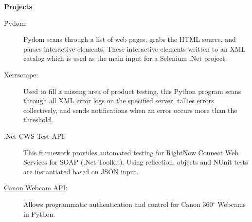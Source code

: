 \documentclass[letterpaper,11pt]{article}
\newcommand{\resheading}[1]{{\large \colorbox{mygrey}{\begin{minipage}{\textwidth}{\textbf{#1 \vphantom{p\^{E}}}}\end{minipage}}}}
\begin{document}
\begin{description}
	\end{description} %

\resheading{\href{http://www.derekhildreth.com/portfolio.php}{Projects}}

\begin{description}
\item[Pydom:] { \footnotesize Pydom scans through a list of web pages, grabs the HTML source, and parses interactive elements. These interactive elements written to an XML catalog which is used as the main input for a Selenium .Net project.}

\item[Xerrscrape:] { \footnotesize Used to fill a missing area of product testing, this Python program scans through all XML error logs on the specified server, tallies errors collectively, and sends notifications when an error occurs more than the threshold.}

\item[.Net CWS Test API:] { \footnotesize This framework provides automated testing for RightNow Connect Web Services for SOAP (.Net Toolkit).  Using reflection, objects and NUnit tests are instantiated based on JSON input.}
\item[\href{https://bitbucket.org/dhildreth/canon\_webview}{Canon Webcam API}:] {\footnotesize Allows programmatic authentication and control for Canon 360$^\circ$ Webcams in Python.}
\end{description}
\end{document}
